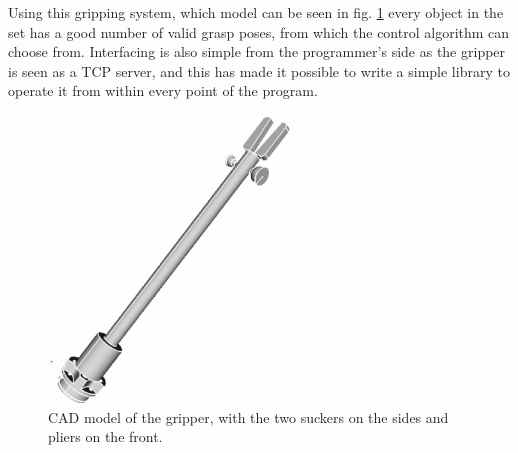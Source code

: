 Using this gripping system, which model can be seen in fig. \ref{fig:gripper}
every object in the set has a good number of valid grasp poses, from which the
control algorithm can choose from. Interfacing is also simple from the
programmer's side as the gripper is seen as a TCP server, and this has made it
possible to write a simple library to operate it from within every point of the
program.

\begin{figure}[htbp] \label{fig:gripper}
  \centering
  \includegraphics[height=3in]{./Graphics/gripper}
  \caption{CAD model of the gripper, with the two suckers on the sides and
  pliers on the front.}
\end{figure}

